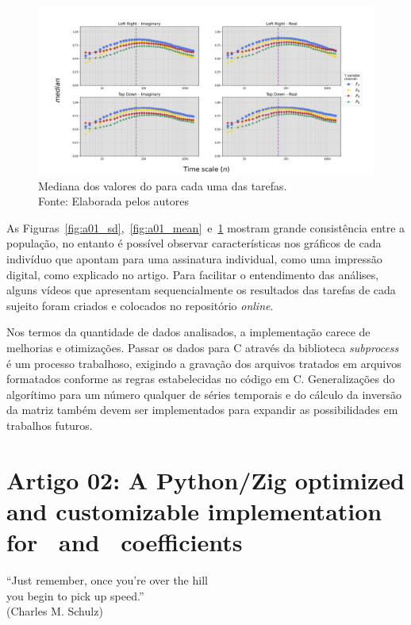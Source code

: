 \begin{figure}[!htb]
	\centering
	\includegraphics[width=.8\textwidth]{./Figures/art_01/median.jpg}
    \captionsetup{justification=centering}
    \caption{Mediana dos valores do \dmc para cada uma das tarefas.\\  Fonte: Elaborada pelos autores}
	\label{fig:a01_median}
\end{figure}

As Figuras~\ref{fig:a01_sd},~\ref{fig:a01_mean}~e~\ref{fig:a01_median} mostram grande consistência entre a população, no entanto é possível observar características nos gráficos de cada indivíduo que apontam para uma assinatura individual, como uma impressão digital, como explicado no artigo. Para facilitar o entendimento das análises, alguns vídeos que apresentam sequencialmente os resultados das tarefas de cada sujeito foram criados e colocados no repositório \emph{online}.

Nos termos da quantidade de dados analisados, a implementação carece de melhorias e otimizações. Passar os dados para C através da biblioteca \emph{subprocess} é um processo trabalhoso, exigindo a gravação dos arquivos tratados em arquivos formatados conforme as regras estabelecidas no código em C. Generalizações do algorítimo para um número qualquer de séries temporais e do cálculo da inversão da matriz também devem ser implementados para expandir as possibilidades em trabalhos futuros.





\section{Artigo 02: A Python/Zig optimized and customizable
implementation for \pdcca~and \dmc~coefficients}
\label{sec:paper_02}

\begin{flushright}
    ``Just remember, once you're over the hill\\
    you begin to pick up speed.''\\[10px]
    (Charles M. Schulz)
    \end{flushright}


